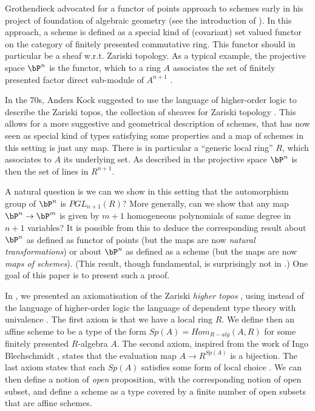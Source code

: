Grothendieck advocated for a functor of points approach to schemes early in his
project of foundation of algebraic geometry (see the introduction of \cite{EGAIV1}).
In this approach, a scheme is defined as a special kind of (covariant) set valued functor
on the category of finitely presented commutative ring. This functor should in particular
be a sheaf w.r.t. Zariski topology. As a typical example, the projective space $\bP^n$
is the functor, which to a ring $A$ associates the set of finitely presented factor direct
sub-module of $A^{n+1}$ \cite{Demazure,Eisenbud,Jantzen}.

In the 70s, Anders Kock suggested to use the language of higher-order logic \cite{Church40}
to describe the Zariski topos, the collection of sheaves for Zariski topology \cite{Kock74,kockreyes}.
This allows for
a more suggestive and geometrical description of schemes, that has now seen as special kind
of types satisfying some properties and a map of schemes in this setting is just any map.
There is in particular a ``generic
local ring'' $R$, which associates to $A$ its underlying set. As described in \cite{kockreyes}
the projective space $\bP^n$ is then the set of lines in $R^{n+1}$.

A natural question is we can we show in this setting that the automorphism group of $\bP^n$
is  $PGL_{n+1}(R)$?
More generally, can we show that any map $\bP^n\rightarrow \bP^m$ is given by $m+1$ homogeneous
polynomials of same degree in $n+1$ variables?
It is possible from this to deduce the corresponding result about $\bP^n$ as defined
as functor of points (but the maps are now {\em natural transformations}) or about $\bP^n$ as
defined as a scheme (but the maps are now {\em maps of schemes}).
(This result, though fundamental, is surprisingly not in \cite{Hartshorne}.)
One goal of this paper is to present such a proof.

In \cite{draft}, we presented an axiomatisation of the Zariski {\em higher topos} \cite{lurie-htt},
using instead of the language of higher-order logic the language of dependent type theory
with univalence \cite{hott}. The first axiom is that we have a local ring $R$. We define
then an affine scheme to be a type of the form $Sp(A) = Hom_{R-alg}(A,R)$ for some finitely presented
$R$-algebra $A$. The second axiom, inspired from the work of Ingo Blechschmidt \cite{ingo-thesis},
states that the evaluation map $A\rightarrow R^{Sp(A)}$ is a bijection. The last axiom states
that each $Sp(A)$ satisfies some form of local choice \cite{draft}. We can then define a notion
of {\em open} proposition, with the corresponding notion of open subset, and define a scheme as a type
covered by a finite number of open subsets that are affine schemes.


